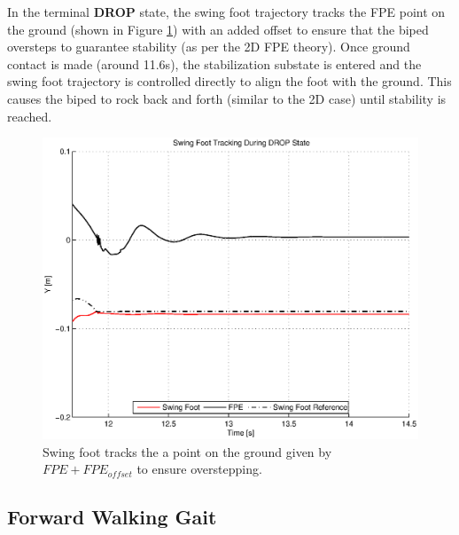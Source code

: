 In the terminal \textbf{DROP} state, the swing foot trajectory tracks the FPE point on the ground (shown in Figure \ref{fig:sidefpetrack}) with an added offset to ensure that the biped oversteps to guarantee stability (as per the 2D FPE theory). Once ground contact is made (around 11.6s), the stabilization substate is entered and the swing foot trajectory is controlled directly to align the foot with the ground. This causes the biped to rock back and forth (similar to the 2D case) until stability is reached.

\begin{figure}[!h]
	\centering
    \includegraphics[scale=0.6]{fig/simulations/sidefpetrack.eps}
  	\caption{Swing foot tracks the a point on the ground given by $FPE + FPE_{offset}$ to ensure overstepping.}
	\label{fig:sidefpetrack}
\end{figure}


\subsection{Forward Walking Gait} %
\label{sub:forward_walking_gait}
\Incomplete 

